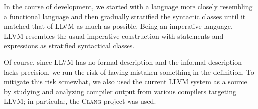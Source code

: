\documentclass[a4paper, oneside, 10pt, final]{memoir}
\newcommand{\clang}{\textsc{Clang}}
\begin{document}
In the course of development, we started with a language more closely
resembling a functional language and then gradually stratified the
syntactic classes until it matched that of LLVM as much as
possible. Being an imperative language, LLVM resembles the usual
imperative construction with statements and expressions as stratified
syntactical classes.

Of course, since LLVM has no formal description and the informal
description lacks precision\cite{lattner.ea:2009:llvm-ref}, we run the
risk of having mistaken something in the definition. To mitigate this
risk somewhat, we also used the current LLVM system as a source by
studying and analyzing compiler output from various compilers
targeting LLVM; in particular, the \clang{}-project was used.

\newcommand{\registers}{\mathrm{Registers}}
\newcommand{\constants}{\mathrm{Constants}}
\newcommand{\operations}{\mathrm{Operations}}
\newcommand{\instructions}{\mathrm{Instructions}}
\newcommand{\programs}{\mathrm{Programs}}
\newcommand{\definitions}{\mathrm{Definitions}}
\newcommand{\basicblocks}{\mathrm{Basic Blocks}}
\newcommand{\iret}[1]{\mathbf{ret} \; #1}
\end{document}
